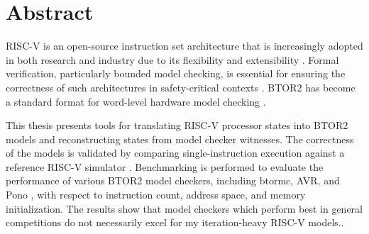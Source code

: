 \chapter*{Abstract}

RISC-V is an open-source instruction set architecture that is
increasingly adopted in both research and industry due to its
flexibility and extensibility \cite{riscv-isa, eu}. Formal
verification, particularly bounded model checking, is essential for
ensuring the correctness of such architectures in safety-critical
contexts \cite{BiereBMC}. BTOR2 has become a standard format for
word-level hardware model checking \cite{btor2, HWMCC}.

This thesis presents tools for translating RISC-V processor states
into BTOR2 models and reconstructing states from model checker
witnesses. The correctness of the models is validated by comparing
single-instruction execution against a reference RISC-V simulator
\cite{repoSim}. Benchmarking is performed to evaluate the performance
of various BTOR2 model checkers, including btormc, AVR, and Pono
\cite{avrPaper, ponoPaper}, with respect to instruction count,
address space, and memory initialization. The results show that model
checkers which perform best in general competitions do not
necessarily excel for my iteration-heavy RISC-V models..